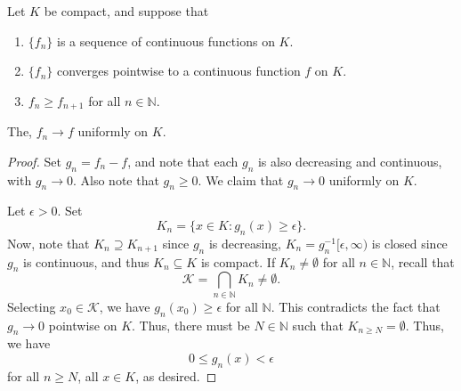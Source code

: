 \documentclass[11pt]{article}
\def\N{\mathbb{N}}
\theoremstyle{definition}
\theoremstyle{remark}
\numberwithin{equation}{module}
\begin{document}
    \begin{theorem}
        Let $K$ be compact, and suppose that 
        \begin{enumerate}
            \itemsep0em
            \item $\{f_n\}$ is a sequence of continuous functions on $K$.
            \item $\{f_n\}$ converges pointwise to a continuous function $f$ on $K$.
            \item $f_n \geq f_{n + 1}$ for all $n \in \N$.
        \end{enumerate}
        The, $f_n \to f$ uniformly on $K$.
    \end{theorem}
    \begin{proof}
        Set $g_n = f_n - f$, and note that each $g_n$ is also decreasing and
        continuous, with $g_n \to 0$. 
        Also note that $g_n \geq 0$.
        We claim that $g_n \to 0$ uniformly on $K$.

        Let $\epsilon > 0$. Set \[
            K_n = \{x \in K\colon g_n(x) \geq \epsilon\}.
        \] Now, note that $K_n \supseteq K_{n + 1}$ since $g_n$ is decreasing, $K_n
        = g_n^{-1}[\epsilon, \infty)$ is closed since $g_n$ is continuous, and thus
        $K_n \subseteq K$ is compact.  If $K_n \neq \emptyset$ for all $n \in \N$,
        recall that \[
            \mathcal{K} = \bigcap_{n \in \N} K_n \neq \emptyset.
        \] Selecting $x_0 \in \mathcal{K}$, we have $g_n(x_0) \geq \epsilon$ for all
        $\N$. This contradicts the fact that $g_n \to 0$ pointwise on $K$. Thus,
        there must be $N \in \N$ such that $K_{n \geq N} = \emptyset$.  Thus, we
        have \[
            0 \leq g_n(x) < \epsilon
        \] for all $n \geq N$, all $x \in K$, as desired.
    \end{proof}
    
\end{document}
